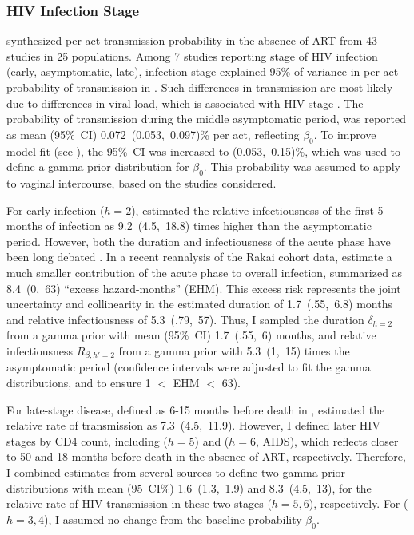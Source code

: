\subsubsection{HIV Infection Stage}\label{model.par.beta.hiv}
\citet{Boily2009} synthesized per-act transmission probability in the absence of ART
from 43 studies in 25 populations.
Among 7 studies reporting stage of HIV infection (early, asymptomatic, late),
infection stage explained 95\% of variance
in per-act probability of transmission in \cite{Boily2009}.
Such differences in transmission are most likely due to differences in viral load,
which is associated with HIV stage \cite{Saag1996,Donnell2010}.
The probability of transmission during the middle asymptomatic period,
was reported as mean (95\%~CI) 0.072~(0.053,~0.097)\% per act, reflecting $\beta_0$.
To improve model fit (see ), the 95\%~CI was increased to (0.053,~0.15)\%,
which was used to define a gamma prior distribution for $\beta_0$.
This probability was assumed to apply to vaginal intercourse,
based on the studies considered.
\par
For early infection ($h=2$), \citet{Boily2009} estimated
the relative infectiousness of the first 5 months of infection
as 9.2~(4.5,~18.8) times higher than the asymptomatic period.
However, both the duration and infectiousness of the acute phase
have been long debated \cite{Hollingsworth2008,Cohen2011,Cohen2012}.
In a recent reanalysis of the Rakai cohort data, \citet{Bellan2015} estimate
a much smaller contribution of the acute phase to overall infection,
summarized as 8.4~(0,~63) ``excess hazard-months'' (EHM).
This excess risk represents the joint uncertainty and collinearity in the estimated
duration of 1.7~(.55,~6.8) months and relative infectiousness of 5.3~(.79,~57).
Thus, I sampled the duration $\delta_{h=2}$ from
a gamma prior with mean (95\%~CI) 1.7~(.55,~6) months,
and relative infectiousness $R_{\beta,h'=2}$ from
a gamma prior with 5.3~(1,~15) times the asymptomatic period
(confidence intervals were adjusted to fit the gamma distributions, and to ensure 1 $<$ EHM $<$ 63).
\par
For late-stage disease, defined as 6-15 months before death in \cite{Boily2009},
\citeauthor{Boily2009} estimated the relative rate of transmission as 7.3~(4.5,~11.9).
However, I defined later HIV stages by CD4 count, including
 ($h=5$) and  ($h=6$, AIDS),
which reflects closer to 50 and 18 months before death in the absence of ART, respectively.
Therefore, I combined estimates from several sources
\cite{Wawer2005,Boily2009,Donnell2010} to define two gamma prior distributions
with mean (95~CI\%) 1.6~(1.3,~1.9) and 8.3~(4.5,~13),
for the relative rate of HIV transmission in these two stages ($h=5,6$), respectively.
For  ($h=3,4$), I assumed no change from the baseline probability $\beta_0$.
